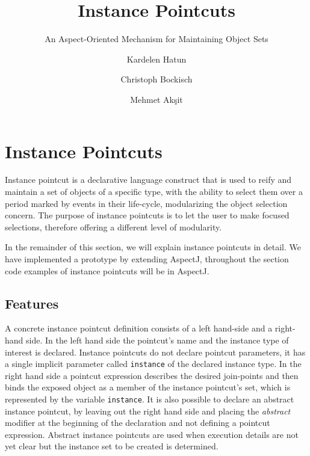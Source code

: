 \documentclass{llncs}
\begin{document}
\title{Instance Pointcuts}
\subtitle{An Aspect-Oriented Mechanism for Maintaining Object Sets}

\author{Kardelen Hatun \and Christoph Bockisch \and Mehmet Ak\c{s}it}




\section{Instance Pointcuts}
Instance pointcut is a declarative language construct that is used to reify and maintain a set of objects of a specific type, with the ability to select them over a period marked by events in their life-cycle, modularizing the object selection concern. The purpose of instance pointcuts is to  let the user to make focused selections, therefore offering a different level of modularity. 
 
In the remainder of this section, we will explain instance pointcuts in detail. We have implemented a prototype by extending AspectJ, throughout the section code examples of instance pointcuts will be in AspectJ.


\subsection{Features}

A concrete instance pointcut definition consists of a left hand-side and a right-hand side. 
In the left hand side the pointcut's name and the instance type of interest is declared. 
Instance pointcuts do not declare pointcut parameters, it has a single implicit parameter called \texttt{instance} of the declared instance type. 
In the right hand side a pointcut expression describes the desired join-points and then binds the exposed object as a member of the instance pointcut's set, which is represented by the variable \texttt{instance}. 
It is also possible to declare an abstract instance pointcut, by leaving out the right hand side and placing the \emph{abstract} modifier at the beginning of the declaration and not defining a pointcut expression. Abstract instance pointcuts are used when execution details are not yet clear but the instance set to be created is determined.
\end{document}
